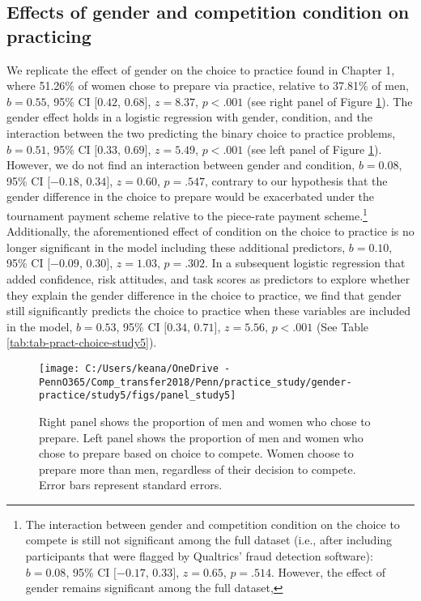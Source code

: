 \documentclass[letterpaper, nobind]{templates/ociamthesis}
\begin{document}
\hypertarget{effects-of-gender-and-competition-condition-on-practicing}{%
\subsection{Effects of gender and competition condition on practicing}\label{effects-of-gender-and-competition-condition-on-practicing}}

We replicate the effect of gender on the choice to practice found in Chapter 1, where 51.26\% of women chose to prepare via practice, relative to 37.81\% of men, \(b = 0.55\), 95\% CI \([0.42\), \(0.68]\), \(z = 8.37\), \(p < .001\) (see right panel of Figure \ref{fig:panel-study5}). The gender effect holds in a logistic regression with gender, condition, and the interaction between the two predicting the binary choice to practice problems, \(b = 0.51\), 95\% CI \([0.33\), \(0.69]\), \(z = 5.49\), \(p < .001\) (see left panel of Figure \ref{fig:panel-study5}). However, we do not find an interaction between gender and condition, \(b = 0.08\), 95\% CI \([-0.18\), \(0.34]\), \(z = 0.60\), \(p = .547\), contrary to our hypothesis that the gender difference in the choice to prepare would be exacerbated under the tournament payment scheme relative to the piece-rate payment scheme.\footnote{The interaction between gender and competition condition on the choice to compete is still not significant among the full dataset (i.e., after including participants that were flagged by Qualtrics' fraud detection software): \(b = 0.08\), 95\% CI \([-0.17\), \(0.33]\), \(z = 0.65\), \(p = .514\). However, the effect of gender remains significant among the full dataset,} Additionally, the aforementioned effect of condition on the choice to practice is no longer significant in the model including these additional predictors, \(b = 0.10\), 95\% CI \([-0.09\), \(0.30]\), \(z = 1.03\), \(p = .302\). In a subsequent logistic regression that added confidence, risk attitudes, and task scores as predictors to explore whether they explain the gender difference in the choice to practice, we find that gender still significantly predicts the choice to practice when these variables are included in the model, \(b = 0.53\), 95\% CI \([0.34\), \(0.71]\), \(z = 5.56\), \(p < .001\) (See Table \ref{tab:tab-pract-choice-study5}).

\begin{figure}

{\centering \texttt{[image: C:/Users/keana/OneDrive - PennO365/Comp\_transfer2018/Penn/practice\_study/gender-practice/study5/figs/panel\_study5]} 

}

\caption{Right panel shows the proportion of men and women who chose to prepare. Left panel shows the proportion of men and women who chose to prepare based on choice to compete. Women choose to prepare more than men, regardless of their decision to compete. Error bars represent standard errors.}\label{fig:panel-study5}
\end{figure}
\end{document}
